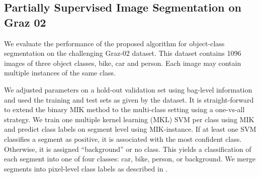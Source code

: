 \subsection{Partially Supervised Image Segmentation on Graz 02}

We evaluate the performance of the proposed algorithm for object-class
segmentation on the challenging Graz-02 dataset.  This dataset contains 1096
images of three object classes, bike, car and person.  Each image may contain
multiple instances of the same class.

We adjusted parameters on a hold-out validation set using bag-level information
and used the training and test sets as given by the dataset.  It is
straight-forward to extend the binary MIK method to the multi-class setting
using a one-vs-all strategy.
We train one multiple kernel learning (MKL) SVM per class using MIK and predict
class labels on segment level using MIK-instance. If at least one SVM
classifies a segment as positive, it is associated with the most confident
class. Otherwise, it is assigned ``background'' or no class.
This yields a classification of each segment into one of four classes: car,
bike, person, or background. We merge segments into pixel-level class labels as
described in .

